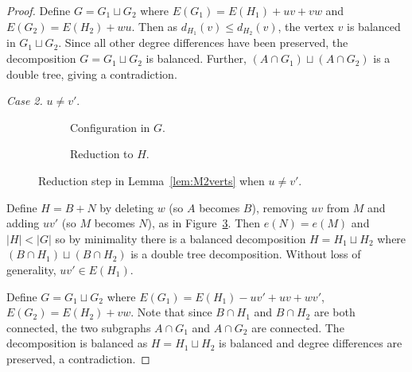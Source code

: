 \documentclass[11pt, reqno, a4paper]{article}
\theoremstyle{definition}
\numberwithin{equation}{section}
\renewcommand{\leq}{\leqslant}
\begin{document}
\begin{proof}
Define $G = G_1\sqcup G_2$ where $E(G_1)= E(H_1) + uv + vw$ and $E(G_2) = E(H_2) + wu$.
Then as $d_{H_1}(v) \leq d_{H_2}(v)$, the vertex $v$ is balanced in $G_1\sqcup G_2$.
Since all other degree differences have been preserved, the decomposition $G = G_1\sqcup G_2$ is balanced.
Further, $(A\cap G_1)\sqcup (A\cap G_2)$ is a double tree, giving a contradiction.

\textit{Case 2.} $u \neq v'$.

\begin{figure}[ht] 
	\centering
    \begin{subfigure}[c][][c]{0.4\textwidth}
    \centering
	\caption{Configuration in $G$.} 
	\label{fig:redgeneral2b}
    \end{subfigure} 
    \begin{subfigure}{0.4\textwidth}
    \centering
	\caption{Reduction to $H$.}
	\label{fig:match2vertsneq}
    \end{subfigure}
    \caption{Reduction step in Lemma~\ref{lem:M2verts} when $u\neq v'$.}
\end{figure}
Define $H = B + N$ by deleting $w$ (so \(A\) becomes $B$), removing $uv$ from \(M\) and adding $uv'$ (so \(M\) becomes \(N\)), as in Figure~\ref{fig:match2vertsneq}.
Then $e(N) = e(M)$ and $|H| < |G|$ so by minimality there is a balanced decomposition $H= H_1 \sqcup H_2$ where $(B\cap H_1) \sqcup (B\cap H_2) $ is a double tree decomposition.
Without loss of generality, $uv'\in E(H_1)$.

Define $G = G_1 \sqcup G_2$ where $E(G_1) = E(H_1) - uv' + uv + wv'$, $E(G_2) = E(H_2) + vw$. 
Note that since $B\cap H_1$ and $B\cap H_2$ are both connected, the two subgraphs $A\cap G_1$ and $A \cap G_2$ are connected.
The decomposition is balanced as $H = H_1\sqcup H_2$ is balanced and degree differences are preserved, 
a contradiction.
\end{proof}
\end{document}

